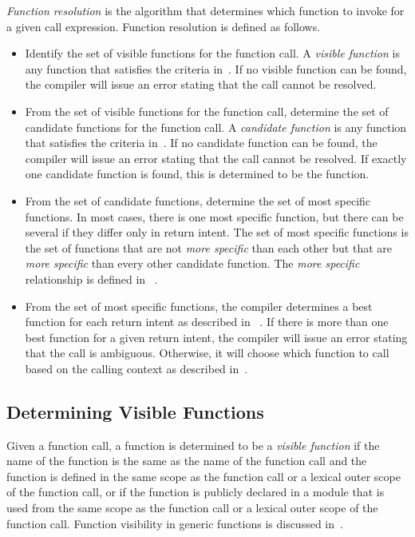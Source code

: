 \emph{Function resolution} is the algorithm that determines
which function to invoke for a given call expression.
Function resolution is defined as follows.
\begin{itemize}
\item
Identify the set of visible functions for the function call.  A
\emph{visible function} is any function that satisfies the criteria
in~.  If no visible function can
be found, the compiler will issue an error stating that the call
cannot be resolved.
\item
From the set of visible functions for the function call, determine the
set of candidate functions for the function call.  A \emph{candidate
function} is any function that satisfies the criteria
in~.  If no candidate function
can be found, the compiler will issue an error stating that the call
cannot be resolved.  If exactly one candidate function is found, this
is determined to be the function.
\item
From the set of candidate functions, determine the set of most specific
functions. In most cases, there is one most specific function, but there
can be several if they differ only in return intent. The set of most
specific functions is the set of functions that are not \emph{more
specific} than each other but that are \emph{more specific} than every
other candidate function. The \emph{more specific} relationship is
defined in ~.
\item
From the set of most specific functions, the compiler determines a best
function for each return intent as described in
~. If there is more than one
best function for a given return intent, the compiler will issue
an error stating that the call is ambiguous. Otherwise, it will choose
which function to call based on the calling context as described
in~.
\end{itemize}

\subsection{Determining Visible Functions}
\label{Determining_Visible_Functions}

Given a function call, a function is determined to be a \emph{visible
function} if the name of the function is the same as the name of the
function call and the function is defined in the same scope as the
function call or a lexical outer scope of the function call, or if the
function is publicly declared in a module that is used from the same
scope as the function call or a lexical outer scope of the function
call.  Function visibility in generic functions is discussed
in~.

